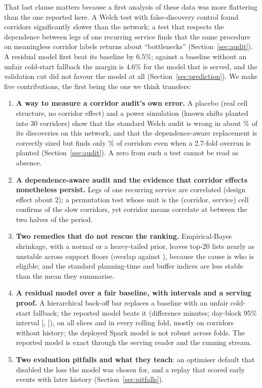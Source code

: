 That last clause matters because a first analysis of these data was more flattering than the one reported here. A Welch test with false-discovery control found \fzBottlenecks{} corridors significantly slower than the network; a test that respects the dependence between legs of one recurring service finds that the same procedure on meaningless corridor labels returns about \fzAuditPlaceboDiscoveriesDpOne{} ``bottlenecks'' (Section~\ref{sec:audit}). A residual model first beat its baseline by 6.5\%; against a baseline without an unfair cold-start fallback the margin is 4.6\% for the model that is served, and the validation cut did not favour the model at all (Section~\ref{sec:prediction}). We make five contributions, the first being the one we think transfers:
\begin{enumerate}
\item \textbf{A way to measure a corridor audit's own error.} A placebo (real cell structure, no corridor effect) and a power simulation (known shifts planted into 30 corridors) show that the standard Welch audit is wrong in about \fzPowerWelchBhFdpShiftHalfPct{}\% of its discoveries on this network, and that the dependence-aware replacement is correctly sized but finds only \fzPowerByPermShiftOnePct{}\% of corridors even when a 2.7-fold overrun is planted (Section~\ref{sec:audit}). A zero from such a test cannot be read as absence.
\item \textbf{A dependence-aware audit and the evidence that corridor effects nonetheless persist.} Legs of one recurring service are correlated (design effect about 2); a permutation test whose unit is the (corridor, service) cell confirms \fzAuditRobustHeadlineSlower{} of the \fzBottlenecks{} slow corridors, yet corridor means correlate at \fzStabilitySpearmanDpTwo{} between the two halves of the period.
\item \textbf{Two remedies that do not rescue the ranking.} Empirical-Bayes shrinkage, with a normal or a heavy-tailed prior, leaves top-20 lists nearly as unstable across support floors (overlap \fzEbTopTwentyJaccardEbDpTwo{} against \fzEbTopTwentyJaccardRawDpTwo{}), because the cause is who is eligible; and the standard planning-time and buffer indices are less stable than the mean they summarise.
\item \textbf{A residual model over a fair baseline, with intervals and a serving proof.} A hierarchical back-off bar replaces a baseline with an unfair cold-start fallback; the reported model beats it (difference \fzReportedVsBarDeltaDpTwo{} minutes; day-block 95\% interval [\fzReportedVsBarCiLowDpTwo{}, \fzReportedVsBarCiHighDpTwo{}]), on all \fzSlicesTotal{} slices and in every rolling fold, mostly on corridors without history; the deployed Spark model is not robust across folds. The reported model is exact through the serving reader and the running stream.
\item \textbf{Two evaluation pitfalls and what they teach}: an optimiser default that disabled the loss the model was chosen for, and a replay that scored early events with later history (Section~\ref{sec:pitfalls}).
\end{enumerate}
